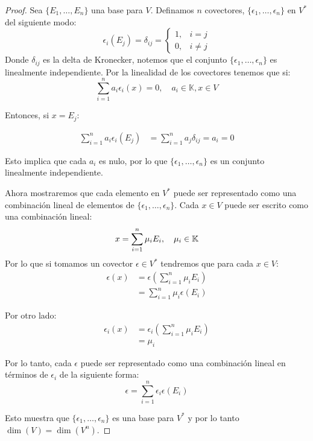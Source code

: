 \begin{proof}
  Sea $\{E_1, \dots, E_n\}$ una base para $V$. Definamos $n$ covectores, $\{\epsilon_1, \dots, \epsilon_n\}$ en $V^{*}$ del siguiente modo:
  \[
    \epsilon_i(E_j) = \delta_{ij} = \begin{cases}
      1, & i = j\\
      0, & i \neq j
    \end{cases}
  \]
  Donde $\delta_{ij}$ es la delta de Kronecker, notemos que el conjunto $\{\epsilon_1, \dots, \epsilon_n\}$ es linealmente independiente. Por la linealidad de los covectores tenemos que si:
\[
  \sum_{i=1}^{n} a_i \epsilon_i(x) = 0, \quad a_{i} \in \mathbb{K}, x \in V
\]

  Entonces, si $x = E_j$:

\begin{align*}
  \sum_{i=1}^n a_i \epsilon_i (E_j) &= \sum_{i=1}^n a_j \delta_{ij} = a_i = 0
\end{align*}

  Esto implica que cada $a_i$ es nulo, por lo que $\{\epsilon_1, \dots, \epsilon_n\}$ es un conjunto linealmente independiente.

  Ahora mostraremos que cada elemento en $V^{*}$ puede ser representado como una combinación lineal de elementos de $\{\epsilon_1, \dots, \epsilon_n\}$. Cada $x \in V$ puede ser escrito como una combinación lineal:
  \[
    x = \sum_{i=1}^{n} \mu_{i} E_i, \quad \mu_i \in \mathbb{K}
  \]
  Por lo que si tomamos un covector $\epsilon \in V^{*}$ tendremos que para cada $x \in V$:
  \begin{align*}
    \epsilon(x) &= \epsilon
    \left (\sum_{i=1}^{n} \mu_i E_i \right)\\
    &= \sum_{i=1}^{n} \mu_i \epsilon \left(E_i \right)
  \end{align*}

  Por otro lado:
  \begin{align*}
    \epsilon_i(x) &= \epsilon_i\left(\sum_{i=1}^{n} \mu_i E_i\right) \\
    &= \mu_i
  \end{align*}

  Por lo tanto, cada $\epsilon$ puede ser representado como una combinación lineal en términos de $\epsilon_i$ de la siguiente forma:
  \[
    \epsilon = \sum_{i=1}^{n} \epsilon_i \epsilon(E_i)
  \]

  Esto muestra que $\{\epsilon_1, \dots, \epsilon_n\}$ es una base para $V^{*}$ y por lo tanto $\dim(V) = \dim(V^{n})$.
\end{proof}

